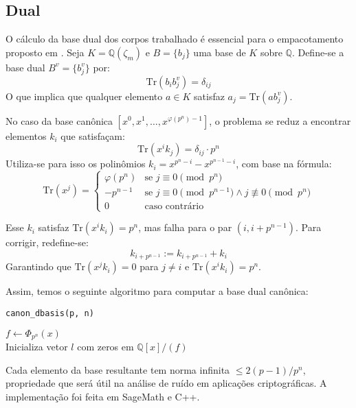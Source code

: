 \subsection{Dual}

O cálculo da base dual dos corpos trabalhado é essencial para o empacotamento proposto em \cite{lw23I}. Seja $K = \mathbb{Q}(\zeta_m)$ e $B = \{b_j\}$ uma base de $K$ sobre $\mathbb{Q}$. Define-se a base dual $B^v = \{b_j^v\}$ por:
\[
\mathrm{Tr}(b_i b_j^v) = \delta_{ij}
\]
O que implica que qualquer elemento $a \in K$ satisfaz $a_j = \mathrm{Tr}(a b_j^v)$.

No caso da base canônica $[x^0,x^1, \dots, x^{\varphi(p^n)-1}]$, o problema se reduz a encontrar elementos $k_i$ que satisfaçam:
\[
\mathrm{Tr}(x^i k_j) = \delta_{ij} \cdot p^n
\]
Utiliza-se para isso os polinômios $k_i = x^{p^n - i} - x^{p^{n-1} - i}$, com base na fórmula:
\[
\mathrm{Tr}(x^j) =
\begin{cases}
\varphi(p^n) & \text{se } j \equiv 0 \pmod{p^n} \\
-p^{n-1} & \text{se } j \equiv 0 \pmod{p^{n-1}} \wedge j \not\equiv 0 \pmod{p^n} \\
0 & \text{caso contrário}
\end{cases}
\]

Esse $k_i$ satisfaz $\mathrm{Tr}(x^i k_i) = p^n$, mas falha para o par $(i, i + p^{n-1})$. Para corrigir, redefine-se:
\[
k_{i + p^{n-1}} := k_{i + p^{n-1}} + k_i
\]
Garantindo que $\mathrm{Tr}(x^j k_i) = 0$ para $j \neq i$ e $\mathrm{Tr}(x^i k_i) = p^n$.

Assim, temos o seguinte algoritmo para computar a base dual canônica:

\begin{algorithm}[H]
\caption{\texttt{canon\_dbasis(p, n)}}
$f \gets \Phi_{p^n}(x)$ \\
Inicializa vetor $l$ com zeros em $\mathbb{Q}[x]/(f)$ \\
\end{algorithm}

Cada elemento da base resultante tem norma infinita $\leq 2(p-1)/p^n$, propriedade que será útil na análise de ruído em aplicações criptográficas. A implementação foi feita em SageMath e C++.  
